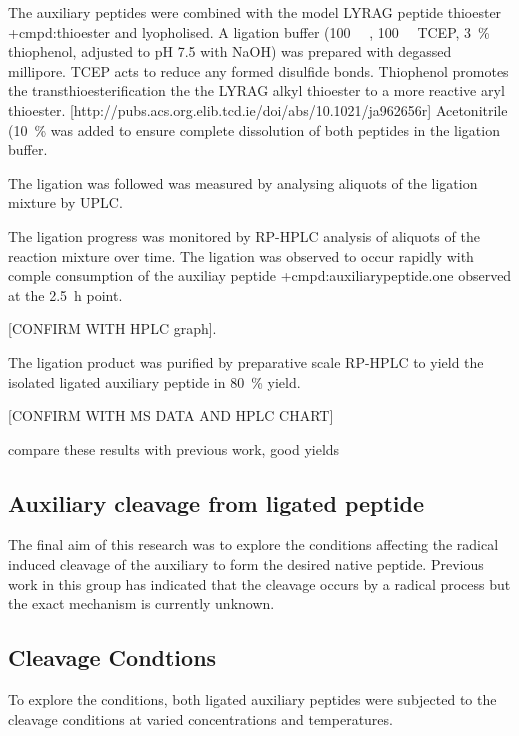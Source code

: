     The auxiliary peptides  were combined with the model LYRAG peptide thioester \cmpd+{cmpd:thioester} and lyopholised. A ligation buffer (\SI{100}{\milli\Molar} , \SI{100}{\milli\Molar} TCEP, \SI{3}{\percent} thiophenol, adjusted to pH 7.5 with NaOH) was prepared with degassed millipore. TCEP acts to reduce any formed disulfide bonds. Thiophenol promotes the transthioesterification the the LYRAG alkyl thioester to a more reactive aryl thioester.
    [http://pubs.acs.org.elib.tcd.ie/doi/abs/10.1021/ja962656r]
    Acetonitrile (\SI{10}{\percent} was added to ensure complete dissolution of both peptides in the ligation buffer.

    The ligation was followed was measured by analysing aliquots of the ligation mixture by UPLC.

    The ligation progress was monitored by RP-HPLC analysis of aliquots of the reaction mixture over time. The ligation was observed to occur rapidly with comple consumption of the auxiliay peptide \cmpd+{cmpd:auxiliarypeptide.one} observed at the \SI{2.5}{\hour} point.

    [CONFIRM WITH HPLC graph].

    The ligation product  was purified by preparative scale RP-HPLC to yield the isolated ligated auxiliary peptide in \SI{80}{\percent} yield.

    [CONFIRM WITH MS DATA AND HPLC CHART]

    compare these results with previous work, good yields

  \subsection{Auxiliary cleavage from ligated peptide}

    The final aim of this research was to explore the conditions affecting the radical induced cleavage of the auxiliary to form the desired native peptide. Previous work in this group has indicated that the cleavage occurs by a radical process but the exact mechanism is currently unknown.

    \subsection{Cleavage Condtions}

    To explore the conditions, both ligated auxiliary peptides were subjected to the cleavage conditions at varied concentrations and temperatures.

